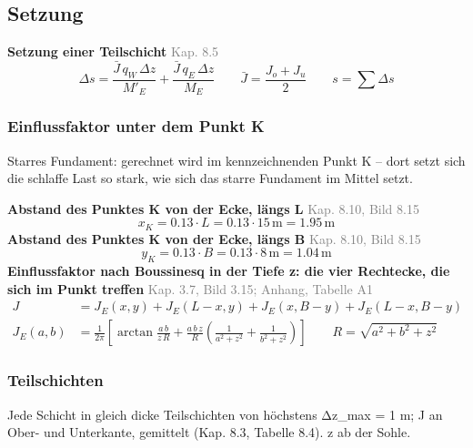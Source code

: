 \documentclass[11pt,a4paper]{article}
\newcommand{\normref}[1]{{\small\textcolor{gray}{#1}}}
\begin{document}
\subsection{Setzung}
\noindent\textbf{Setzung einer Teilschicht} \hfill \normref{Kap. 8.5}
\begin{equation*}
\Delta s = \frac{\bar{J} \, q_W \, \Delta z}{M'_E} + \frac{\bar{J} \, q_E \, \Delta z}{M_E} \qquad \bar{J} = \frac{J_o + J_u}{2} \qquad s = \sum \Delta s
\end{equation*}
\subsubsection{Einflussfaktor unter dem Punkt K}
Starres Fundament: gerechnet wird im kennzeichnenden Punkt K -- dort setzt sich die schlaffe Last so stark, wie sich das starre Fundament im Mittel setzt.

\noindent\textbf{Abstand des Punktes K von der Ecke, längs L} \hfill \normref{Kap. 8.10, Bild 8.15}
\begin{equation*}
x_K = 0.13 \cdot L = 0.13 \cdot 15\,\mathrm{m} = 1.95\,\mathrm{m}
\end{equation*}
\noindent\textbf{Abstand des Punktes K von der Ecke, längs B} \hfill \normref{Kap. 8.10, Bild 8.15}
\begin{equation*}
y_K = 0.13 \cdot B = 0.13 \cdot 8\,\mathrm{m} = 1.04\,\mathrm{m}
\end{equation*}
\noindent\textbf{Einflussfaktor nach Boussinesq in der Tiefe z: die vier Rechtecke, die sich im Punkt treffen} \hfill \normref{Kap. 3.7, Bild 3.15; Anhang, Tabelle A1}
\begin{equation*}
\begin{aligned} J &= J_E(x, y) + J_E(L - x, y) + J_E(x, B - y) + J_E(L - x, B - y) \\ J_E(a, b) &= \frac{1}{2\pi} \left[\arctan\frac{a \, b}{z \, R} + \frac{a \, b \, z}{R} \left(\frac{1}{a^2 + z^2} + \frac{1}{b^2 + z^2}\right)\right] \qquad R = \sqrt{a^2 + b^2 + z^2} \end{aligned}
\end{equation*}
\subsubsection{Teilschichten}
Jede Schicht in gleich dicke Teilschichten von höchstens Δz\_max = 1 m; J an Ober- und Unterkante, gemittelt (Kap. 8.3, Tabelle 8.4). z ab der Sohle.
\end{document}
